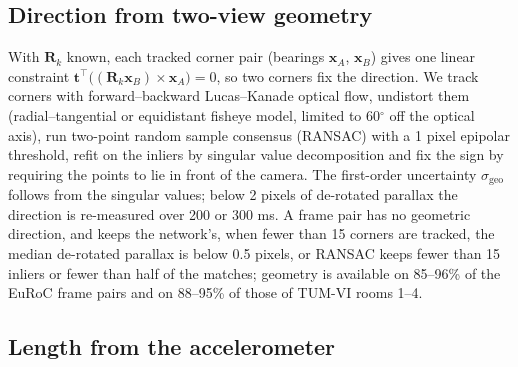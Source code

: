 \documentclass[pdflatex,sn-nature]{sn-jnl}
\begin{document}
\subsection{Direction from two-view geometry}

With $\mathbf{R}_k$ known, each tracked corner pair (bearings $\mathbf{x}_A$, $\mathbf{x}_B$) gives one linear constraint $\mathbf{t}^\top\big((\mathbf{R}_k\mathbf{x}_B)\times\mathbf{x}_A\big)=0$, so two corners fix the direction. We track corners with forward--backward Lucas--Kanade optical flow, undistort them (radial--tangential or equidistant fisheye model, limited to 60$^\circ$ off the optical axis), run two-point random sample consensus (RANSAC) with a 1 pixel epipolar threshold, refit on the inliers by singular value decomposition and fix the sign by requiring the points to lie in front of the camera. The first-order uncertainty $\sigma_\mathrm{geo}$ follows from the singular values; below 2 pixels of de-rotated parallax the direction is re-measured over 200 or 300 ms. A frame pair has no geometric direction, and keeps the network's, when fewer than 15 corners are tracked, the median de-rotated parallax is below 0.5 pixels, or RANSAC keeps fewer than 15 inliers or fewer than half of the matches; geometry is available on 85--96\% of the EuRoC frame pairs and on 88--95\% of those of TUM-VI rooms 1--4.

\subsection{Length from the accelerometer}
\end{document}
